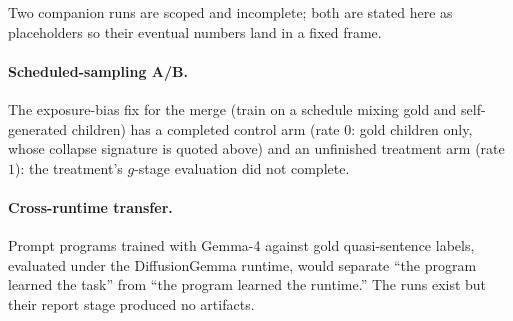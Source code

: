 Two companion runs are scoped and incomplete; both are stated here as
placeholders so their eventual numbers land in a fixed frame.

\paragraph{Scheduled-sampling A/B.} The exposure-bias fix for the
merge (train on a schedule mixing gold and self-generated children)
has a completed control arm (rate $0$: gold children only, whose
collapse signature is quoted above) and an unfinished treatment arm
(rate $1$): the treatment's $g$-stage evaluation did not complete.

\paragraph{Cross-runtime transfer.} Prompt programs trained with
Gemma-4 against gold quasi-sentence labels, evaluated under the
DiffusionGemma runtime, would separate ``the program learned the
task'' from ``the program learned the runtime.'' The runs exist but
their report stage produced no artifacts. 
